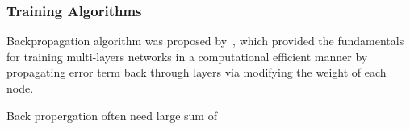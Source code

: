 \subsubsection{Training Algorithms}
Backpropagation algorithm was proposed by~\citet{werbos1975beyond}, which provided the fundamentals for training multi-layers networks in a computational efficient manner by propagating error term back through layers via modifying the weight of each node. 
\par
Back propergation often need  large sum of 